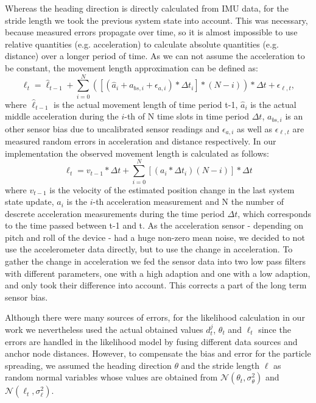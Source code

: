 Whereas the heading direction is directly calculated from IMU data, for the stride length we took the previous system state into account. This was necessary, because measured errors propagate over time, so it is almost impossible to use relative quantities (e.g. acceleration) to calculate absolute quantities (e.g. distance) over a longer period of time. As we can not assume the acceleration to be constant, the movement length approximation can be defined as: 
$$\ell_{t} = \hat{\ell}_{t-1} + \sum_{i=0}^{N}([(\hat{a}_{i} + a_{bs,i} +\epsilon_{a, i}) * \Delta t_{i} ]*(N-i)) *\Delta t + \epsilon_{\ell, t},$$
where $\hat{\ell}_{t-1}$ is the actual movement length of time period t-1, $\hat{a}_{i}$ is the actual middle acceleration during the $i$-th of N time slots in time period $\Delta t$, $a_{bs,i}$ is an other sensor bias due to uncalibrated sensor readings and $\epsilon_{a, i}$ as well as $\epsilon_{\ell, t}$ are measured random errors in acceleration and distance respectively.
In our implementation the observed movement length is calculated as follows:
$$\ell_{t} = v_{t-1} * \Delta t + \sum_{i=0}^N [(a_{i} * \Delta t_{i})(N-i)]* \Delta t$$
where $v_{t-1}$ is the velocity of the estimated position change in the last system state update, $a_{i}$ is the $i$-th acceleration measurement and N the number of descrete acceleration measurements during the time period $\Delta t$, which corresponds to the time passed between t-1 and t. As the acceleration sensor - depending on pitch and roll of the device - had a huge non-zero mean noise, we decided to not use the accelerometer data directly, but to use the change in acceleration. To gather the change in acceleration we fed the sensor data into two low pass filters with different parameters, one with a high adaption and one with a low adaption, and only took their difference into account. This corrects a part of the long term sensor bias. 

Although there were many sources of errors, for the likelihood calculation in our work we nevertheless used the actual obtained values $d^{j}_{t}$, $\theta_{t}$ and $\ell_{t}$ since the errors are handled in the likelihood model by fusing different data sources and anchor node distances. However, to compensate the bias and error for the particle spreading, we assumed the heading direction $\theta$ and the stride length $\ell$ as random normal variables whose values are obtained from $\mathcal{N}(\theta_{t}, \sigma_{\theta}^{2})$ and $\mathcal{N}(\ell_{t}, \sigma_{\ell}^{2})$.

